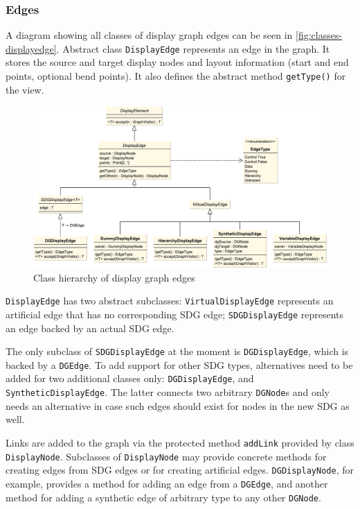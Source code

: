 \subsubsection{Edges}

A diagram showing all classes of display graph edges can be seen in \autoref{fig:classes-displayedge}. Abstract class 
\lstinline|DisplayEdge| represents an edge in the graph. It stores the source and target display nodes and layout 
information (start and end points, optional bend points). It also defines the abstract method \lstinline|getType()| for 
the view.

\begin{figure}
  \centering
    \includegraphics[scale=0.5]{bilder/classes-displayedge}
  \caption{Class hierarchy of display graph edges}
  \label{fig:classes-displayedge}
\end{figure}

\lstinline|DisplayEdge| has two abstract subclasses: \lstinline|VirtualDisplayEdge| represents an artificial edge that 
has no corresponding SDG edge; \lstinline|SDGDisplayEdge| represents an edge backed by an actual SDG edge.

The only subclass of \lstinline|SDGDisplayEdge| at the moment is \lstinline|DGDisplayEdge|, which is backed by a 
\lstinline|DGEdge|. To add support for other SDG types, alternatives need to be added for two additional classes 
only: \lstinline|DGDisplayEdge|, and \lstinline|SyntheticDisplayEdge|. The latter connects two arbitrary 
\lstinline|DGNode|s and only needs an alternative in case such edges should exist for nodes in the new SDG as well.

Links are added to the graph via the protected method \lstinline|addLink| provided by class \lstinline|DisplayNode|. 
Subclasses of \lstinline|DisplayNode| may provide concrete methods for creating edges from SDG edges or for creating 
artificial edges. \lstinline|DGDisplayNode|, for example, provides a method for adding an edge from a 
\lstinline|DGEdge|, and another method for adding a synthetic edge of arbitrary type to any other \lstinline|DGNode|.


